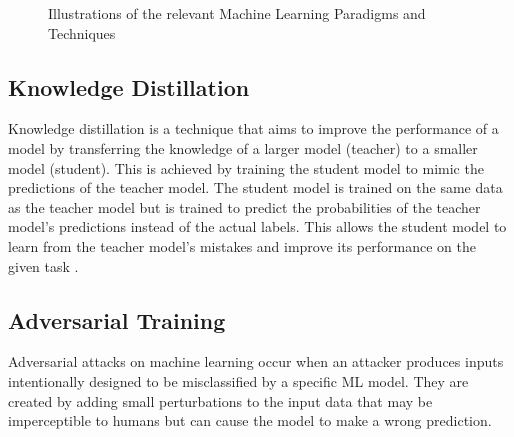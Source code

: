 \documentclass[../main.tex]{subfiles}
\begin{document}

     \newpage

    \begin{figure}
        \centering
        \caption{Illustrations of the relevant Machine Learning Paradigms and Techniques}
        \resizebox*{1.15\columnwidth}{!}{
            \hspace*{-1.5cm}
            
        }
        \label{fig:relevant_ml_paradigms}
    \end{figure}
    \clearpage

     \subsection{Knowledge Distillation} \label{sec:knowledge_distillation} 

    Knowledge distillation is a technique that aims to improve the performance of a model by transferring the knowledge of a larger model (teacher) to a smaller model (student). This is achieved by training the student model to mimic the predictions of the teacher model. The student model is trained on the same data as the teacher model but is trained to predict the probabilities of the teacher model's predictions instead of the actual labels. This allows the student model to learn from the teacher model's mistakes and improve its performance on the given task \cite{hinton_distilling_2015}.
    


    \subsection{Adversarial Training} \label{sec:adversarial_training} 

    Adversarial attacks on machine learning occur when an attacker produces inputs intentionally designed to be misclassified by a specific ML model. They are created by adding small perturbations to the input data that may be imperceptible to humans but can cause the model to make a wrong prediction.
    
\end{document}

